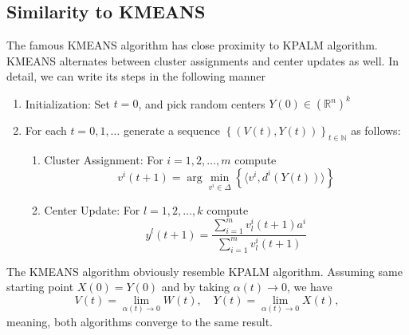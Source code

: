 \documentclass[11pt]{article}
\numberwithin{equation}{section}
\begin{document}
\subsection{Similarity to KMEANS}
The famous KMEANS algorithm has close proximity to KPALM algorithm. KMEANS alternates between cluster assignments and center updates as well. In detail, we can write its steps in the following manner

\begin{enumerate}[(1)]
	\item Initialization: Set $t=0$, and pick random centers $Y(0) \in (\mathbb{R}^n)^k$

	\item For each $t=0,1, \ldots$ generate a sequence $\left\lbrace(V(t),Y(t))\right\rbrace_{t \in \mathbb{N}}$ as follows:
	\begin{enumerate}[(2.1)]
		\item Cluster Assignment: For $i=1, 2, \ldots ,m$ compute
		\begin{equation}
			v^i(t+1) = \arg\min\limits_{v^i \in \Delta} \left\lbrace \langle v^i , d^i(Y(t)) \rangle\right\rbrace \label{StateEq12}
		\end{equation}
		
		\item Center Update: For $l=1, 2, \ldots ,k$ compute
		\begin{equation}
			y^l(t+1) = \frac{\sum_{i=1}^{m} v^i_l(t+1) a^i}{\sum_{i=1}^{m} v^i_l(t+1)} \label{StateEq13}
		\end{equation}
	\end{enumerate}
\end{enumerate}
The KMEANS algorithm obviously resemble KPALM algorithm. Assuming same starting point $X(0) = Y(0)$ and by taking $\alpha(t) \to 0$, we have
\begin{equation*}
	V(t) = \lim_{\alpha(t) \to 0} W(t), \quad
	Y(t) = \lim_{\alpha(t) \to 0} X(t),
\end{equation*}
meaning, both algorithms converge to the same result.

\newpage
\end{document}
